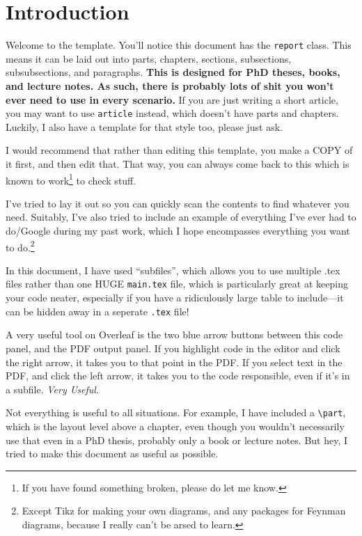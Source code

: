 \documentclass[../main]{subfiles}
\begin{document}
\chapter{Introduction}

Welcome to the template. You'll notice this document has the \texttt{report} class. This means it can be laid out into parts, chapters, sections, subsections, subsubsections, and paragraphs. \textbf{This is designed for PhD theses, books, and lecture notes. As such, there is probably lots of shit you won't ever need to use in every scenario.} If you are just writing a short article, you may want to use \texttt{article} instead, which doesn't have parts and chapters. Luckily, I also have a template for that style too, please just ask.

I would recommend that rather than editing this template, you make a COPY of it first, and then edit that. That way, you can always come back to this which is known to work\footnote{If you have found something broken, please do let me know.} to check stuff.

I've tried to lay it out so you can quickly scan the contents to find whatever you need. Suitably, I've also tried to include an example of everything I've ever had to do/Google during my past work, which I hope encompasses everything you want to do.\footnote{Except Tikz for making your own diagrams, and any packages for Feynman diagrams, because I really can't be arsed to learn.}

In this document, I have used ``subfiles'', which allows you to use multiple .tex files rather than one HUGE \texttt{main.tex} file, which is particularly great at keeping your code neater, especially if you have a ridiculously large table to include---it can be hidden away in a seperate \texttt{.tex} file!

A very useful tool on Overleaf is the two blue arrow buttons between this code panel, and the PDF output panel. If you highlight code in the editor and click the right arrow, it takes you to that point in the PDF. If you select text in the PDF, and click the left arrow, it takes you to the code responsible, even if it's in a subfile. \emph{Very Useful}.

Not everything is useful to all situations. For example, I have included a \verb|\part|, which is the layout level above a chapter, even though you wouldn't necessarily use that even in a PhD thesis, probably only a book or lecture notes. But hey, I tried to make this document as useful as possible.
\end{document}
